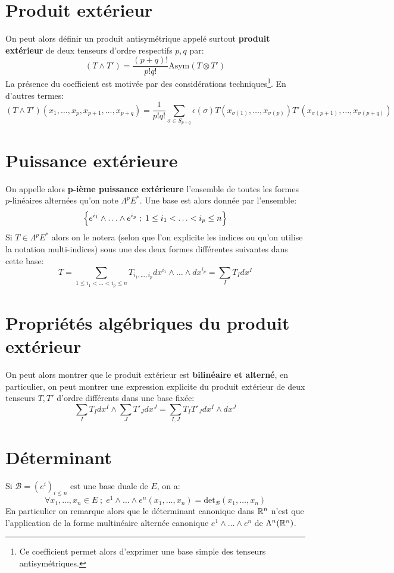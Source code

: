    \section{Produit extérieur}
   On peut alors définir un produit antisymétrique appelé surtout \textbf{produit extérieur} de deux tenseurs d'ordre respectifs \( p, q \) par:
   \[
      (T \wedge T') = \frac{(p+q)!}{p!q!}\text{Asym}(T \otimes T')
   \]
   La présence du coefficient est motivée par des considérations techniques\footnote[1]{Ce coefficient permet alors d'exprimer une base simple des tenseurs antisymétriques.}. En d'autres termes:
   \[
      (T \wedge T')(x_1, \ldots, x_p, x_{p+1}, \ldots, x_{p+q}) =  \frac{1}{p!q!}\sum_{\sigma \in S_{p+q}}\epsilon(\sigma) T(x_{\sigma(1)}, \ldots, x_{\sigma(p)})T'(x_{\sigma(p+1)}, \ldots, x_{\sigma(p+q)})
   \]
   \section{Puissance extérieure}
   On appelle alors \textbf{p-ième puissance extérieure} l'ensemble de toutes les formes \(p\)-linéaires alternées qu'on note \(\Lambda^p E^*\). Une base est alors donnée par l'ensemble:
   \[
      \Bigl\{ e^{i_1} \wedge \ldots \wedge e^{i_p} \; ; \; 1 \leq i_1 < \ldots < i_p \leq n  \Bigl\}
   \]
   Si \( T \in \Lambda^p E^*\) alors on le notera (selon que l'on explicite les indices ou qu'on utilise la notation multi-indices) sous une des deux formes différentes suivantes dans cette base:
   \[ 
      T = \sum_{1 \leq i_1 < \ldots < i_p \leq n} T_{i_1, \ldots, i_p} dx^{i_1} \wedge \ldots \wedge dx^{i_p} = \sum_{I} T_{I} dx^I 
   \]  
   \section{Propriétés algébriques du produit extérieur}
   On peut alors montrer que le produit extérieur est \textbf{bilinéaire et alterné}, en particulier, on peut montrer une expression explicite du produit extérieur de deux tenseurs \( T, T' \) d'ordre différents dans une base fixée:
   \[ 
      \sum_{I} T_{I} dx^I \wedge \sum_{J} T'_{J} dx^J = \sum_{I, J} T_{I}T'_{J} dx^I \wedge dx^J
   \]
   \pagebreak
   \section{Déterminant}
   Si \( \mathcal{B} = (e^i)_{i \leq n} \) est une base duale de \( E \), on a:
   \[ 
      \forall x_1, \ldots, x_n \in E \; ; \; e^1 \wedge \ldots \wedge e^n(x_1, \ldots, x_n) = \text{det}_{\mathcal{B}}(x_1, \ldots, x_n)
   \]
   En particulier on remarque alors que le déterminant canonique dans \( \mathbb{R}^n \) n'est que l'application de la forme multinéaire alternée canonique \( e^1 \wedge \ldots \wedge e^n \) de \( \Lambda^n(\mathbb{R}^n) \).
